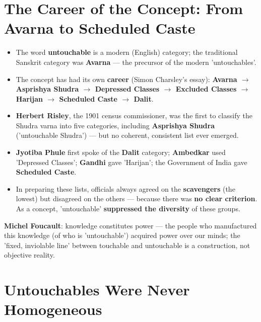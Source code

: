 \section{The Career of the Concept: From Avarna to Scheduled Caste}

\begin{KeyConcept}
\begin{itemize}
\item The word \textbf{untouchable} is a modern (English) category; the traditional Sanskrit category was \textbf{Avarna} --- the precursor of the modern 'untouchables'.
\item The concept has had its own \textbf{career} (Simon Charsley's essay): \textbf{Avarna $\rightarrow$ Asprishya Shudra $\rightarrow$ Depressed Classes $\rightarrow$ Excluded Classes $\rightarrow$ Harijan $\rightarrow$ Scheduled Caste $\rightarrow$ Dalit}.
\item \textbf{Herbert Risley}, the 1901 census commissioner, was the first to classify the Shudra varna into five categories, including \textbf{Asprishya Shudra} ('untouchable Shudra') --- but no coherent, consistent list ever emerged.
\item \textbf{Jyotiba Phule} first spoke of the \textbf{Dalit} category; \textbf{Ambedkar} used 'Depressed Classes'; \textbf{Gandhi} gave 'Harijan'; the Government of India gave \textbf{Scheduled Caste}.
\item In preparing these lists, officials always agreed on the \textbf{scavengers} (the lowest) but disagreed on the others --- because there was \textbf{no clear criterion}. As a concept, 'untouchable' \textbf{suppressed the diversity} of these groups.
\end{itemize}
\end{KeyConcept}

\begin{KeyConcept}
\textbf{Michel Foucault}: knowledge constitutes power --- the people who manufactured this knowledge (of who is 'untouchable') acquired power over our minds; the 'fixed, inviolable line' between touchable and untouchable is a construction, not objective reality.
\end{KeyConcept}

\section{Untouchables Were Never Homogeneous}

